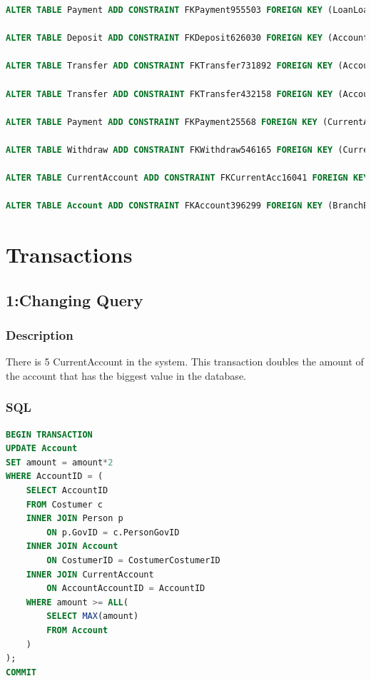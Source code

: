 \documentclass[a4paper, 10pt]{article}
\begin{document}
\begin{lstlisting}[language=SQL]
ALTER TABLE Payment ADD CONSTRAINT FKPayment955503 FOREIGN KEY (LoanLoanID) REFERENCES Loan (LoanID);

ALTER TABLE Deposit ADD CONSTRAINT FKDeposit626030 FOREIGN KEY (AccountAccountID) REFERENCES Account (AccountID);

ALTER TABLE Transfer ADD CONSTRAINT FKTransfer731892 FOREIGN KEY (AccountAccountIDFrom) REFERENCES Account (AccountID);

ALTER TABLE Transfer ADD CONSTRAINT FKTransfer432158 FOREIGN KEY (AccountAccountIDTo) REFERENCES Account (AccountID);

ALTER TABLE Payment ADD CONSTRAINT FKPayment25568 FOREIGN KEY (CurrentAccountAccountID) REFERENCES CurrentAccount (AccountAccountID);

ALTER TABLE Withdraw ADD CONSTRAINT FKWithdraw546165 FOREIGN KEY (CurrentAccountAccountID) REFERENCES CurrentAccount (AccountAccountID);

ALTER TABLE CurrentAccount ADD CONSTRAINT FKCurrentAcc16041 FOREIGN KEY (AccountAccountID) REFERENCES Account (AccountID);

ALTER TABLE Account ADD CONSTRAINT FKAccount396299 FOREIGN KEY (BranchBranchId) REFERENCES Branch (BranchId);
\end{lstlisting}

\section{Transactions}

\subsection{1:Changing Query}
\subsubsection{Description}
There is 5 CurrentAccount in the system. This transaction doubles the amount of the account that has the biggest value in the database.

\subsubsection{SQL}
\begin{lstlisting}[language=SQL]
BEGIN TRANSACTION
UPDATE Account 
SET amount = amount*2 
WHERE AccountID = (
    SELECT AccountID 
    FROM Costumer c 
    INNER JOIN Person p 
        ON p.GovID = c.PersonGovID 
    INNER JOIN Account 
        ON CostumerID = CostumerCostumerID 
    INNER JOIN CurrentAccount 
        ON AccountAccountID = AccountID 
    WHERE amount >= ALL(
        SELECT MAX(amount) 
        FROM Account 
    )
);
COMMIT
\end{lstlisting}
\end{document}
